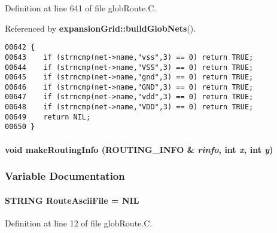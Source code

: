 Definition at line 641 of file glob\-Route.C.

Referenced by {\bf expansion\-Grid::build\-Glob\-Nets}().\small\begin{verbatim}00642 {
00643    if (strncmp(net->name,"vss",3) == 0) return TRUE;
00644    if (strncmp(net->name,"VSS",3) == 0) return TRUE;
00645    if (strncmp(net->name,"gnd",3) == 0) return TRUE;
00646    if (strncmp(net->name,"GND",3) == 0) return TRUE;
00647    if (strncmp(net->name,"vdd",3) == 0) return TRUE;
00648    if (strncmp(net->name,"VDD",3) == 0) return TRUE;
00649    return NIL;
00650 }
\end{verbatim}\normalsize 
\label{globRoute.C_a2}
\paragraph{\setlength{\rightskip}{0pt plus 5cm}void make\-Routing\-Info ({\bf ROUTING\_\-INFO} \& {\em rinfo}, int {\em x}, int {\em y})\hspace{0.3cm}{\tt  [static]}}\hfill



\subsubsection{Variable Documentation}
\label{globRoute.C_a4}
\paragraph{\setlength{\rightskip}{0pt plus 5cm}STRING Route\-Ascii\-File = NIL}\hfill



Definition at line 12 of file glob\-Route.C.